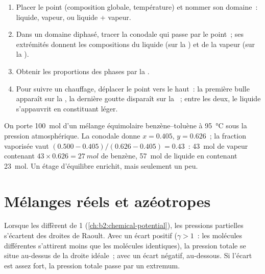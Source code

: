 \begin{method}\label{met:b2:liquid-vapour-diagrams:read-diagram}
\begin{enumerate}
  \item Placer le point (composition globale, température) et nommer son
        domaine~: liquide, vapeur, ou liquide + vapeur.
  \item Dans un domaine diphasé, tracer la conodale qui passe par le point~; ses extrémités
        donnent les compositions du liquide (sur la ) et de la
        vapeur (sur la ).
  \item Obtenir les proportions des phases par la .
  \item Pour suivre un chauffage, déplacer le point vers le haut~: la première bulle apparaît
        sur la , la dernière goutte disparaît sur la ~;
        entre les deux, le liquide s'appauvrit en constituant léger.
\end{enumerate}
\end{method}

\begin{example}\label{ex:b2:liquid-vapour-diagrams:flash}
On porte \qty{100}{mol} d'un mélange équimolaire benzène--toluène à
\qty{95}{\degreeCelsius} sous la pression atmosphérique. La conodale donne $x =
0.405$, $y = 0.626$~; la fraction vaporisée vaut $(0.500 - 0.405)/(0.626 - 0.405) =
0.43$~: \qty{43}{mol} de vapeur contenant $43 \times 0.626 = \qty{27}{mol}$ de
benzène, \qty{57}{mol} de liquide en contenant \qty{23}{mol}. Un étage d'équilibre
enrichit, mais seulement un peu.
\end{example}

\section{Mélanges réels et azéotropes}

Lorsque les  diffèrent de 1 (\cref{ch:b2:chemical-potential}),
les pressions partielles s'écartent des droites de Raoult. Avec un écart
positif ($\gamma > 1$~: les molécules différentes s'attirent moins que les molécules
identiques), la pression totale se situe au-dessus de la droite idéale~; avec un écart négatif,
au-dessous. Si l'écart est assez fort, la pression totale passe par un
extremum.

